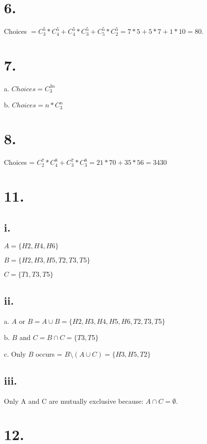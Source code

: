 \documentclass{article}
\begin{document}
\section*{6.}

Choices $= C^5_3 * C^5_4 + C^5_4 * C^5_3 + C^5_5 * C^5_2 = 7*5 + 5*7 + 1*10 = 80$.

\section*{7.}

a. $Choices = C^{3n}_3$

\noindent
b. $Choices = n*C^{n}_3$

\section*{8.}

Choices = $C^7_2 * C^8_4 + C^7_3 * C^8_3 = 21 * 70 + 35 * 56 = 3430$

\section*{11.}

\subsection*{i.}
$A = \{ H2, H4, H6 \}$

\noindent
$B = \{ H2, H3, H5, T2, T3, T5 \}$


\noindent
$C = \{ T1, T3, T5 \}$

\subsection*{ii.}
a. $A$ or $B = A \cup B = \{ H2, H3, H4, H5, H6, T2, T3, T5 \}$

\noindent
b. $B$ and $C = B \cap C = \{ T3, T5 \}$

\noindent
c. Only $B$ occurs = $B \setminus (A \cup C) = \{ H3, H5, T2 \}$

\subsection*{iii.}
Only A and C are mutually exclusive because: $A \cap C = \emptyset$.

\section*{12.}
\end{document}
